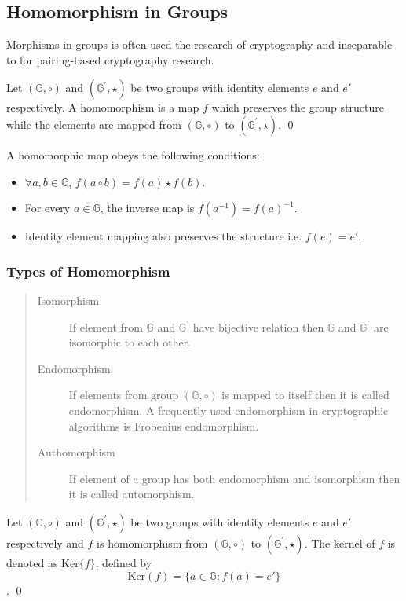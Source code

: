 \subsection{Homomorphism in Groups }
Morphisms in groups is often used the research of cryptography and inseparable to for pairing-based cryptography research.
\begin{definition}
	Let $(\mathbb{G},\circ)$ and $(\mathbb{G}^{'},\star)$ be two groups with identity elements $e$ and $e'$ respectively.
	A homomorphism  is a map $f$ which preserves the group structure while the elements are mapped from $(\mathbb{G},\circ)$ to $(\mathbb{G}^{'},\star)$.
	\qed
\end{definition}
	A homomorphic map obeys the following conditions:
	\begin{itemize}
		\item $\forall a,b \in \mathbb{G}$, $f(a \circ b) = f(a) \star f(b)$.
		\item  For every $a \in \mathbb{G}$, the inverse map is $f(a^{-1}) = f(a)^{-1}$.
		\item  Identity element mapping also preserves the structure i.e. $f(e) =e'$.
	\end{itemize}

\subsubsection{Types of Homomorphism}
\begin{quote}
	\begin{description}
				\item[Isomorphism ] If element from $\mathbb{G}$  and $\mathbb{G}^{'}$ have bijective relation then $\mathbb{G}$ and $\mathbb{G}^{'}$ are isomorphic to each other.
					
			\item[Endomorphism  ]  If elements from group $(\mathbb{G},\circ)$ is mapped to itself then it is called endomorphism. 
			A frequently used endomorphism in cryptographic algorithms is Frobenius endomorphism. 
			
			\item[Authomorphism  ] If element of a group has both endomorphism and isomorphism then it is called automorphism.
	\end{description}
\end{quote}

\begin{definition}
	Let $(\mathbb{G},\circ)$ and $(\mathbb{G}^{'},\star)$ be two groups with identity elements $e$ and $e'$ respectively and $f$ is homomorphism from $(\mathbb{G},\circ)$ to $(\mathbb{G}^{'},\star)$.
	The kernel of $f$ is denoted as $\text{Ker}\{f\}$, defined by 
	$$\text{Ker}(f) = \{ a \in \mathbb{G}: f(a) = e'\}$$.
	\qed
\end{definition}

